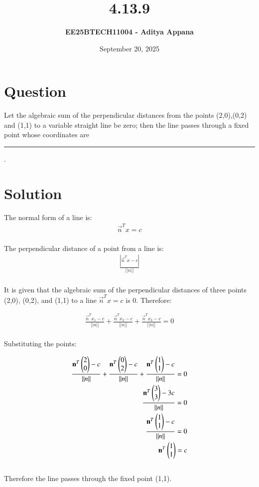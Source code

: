 \documentclass[12pt]{article}
\title{\textbf{4.13.9}}
\author{\textbf{EE25BTECH11004 - Aditya Appana}}
\date{September 20, 2025}
\begin{document}
\maketitle

\section*{Question}
Let the algebraic sum of the perpendicular distances from the points (2,0),(0,2) and
(1,1) to a variable straight line be zero; then the line passes through a fixed point
whose coordinates are \rule{1.5cm}{0.15mm}.

\section*{Solution}

The normal form of a line is:
\begin{align}
\vec{n}^Tx = c
\end{align}\\
The perpendicular distance of a point from a line is:
\begin{align}
\frac{|\vec{n}^Tx - c|}{||n||}
\end{align}\\
It is given that the algebraic sum of the perpendicular distances of three points (2,0), (0,2), and (1,1) to a line $\vec{n}^Tx = c$ is 0. Therefore:

\begin{align}
\frac{\vec{n}^Tx_1 - c}{||n||} + \frac{\vec{n}^Tx_2 - c}{||n||} + \frac{\vec{n}^Tx_3 - c}{||n||} = 0
\end{align}\\
Substituting the points:

\begin{align}
\frac{\mathbf{n}^T\begin{pmatrix}2\\0\end{pmatrix} - c}{||n||} + \frac{\mathbf{n}^T\begin{pmatrix}0\\2\end{pmatrix} - c}{||n||} + \frac{\mathbf{n}^T\begin{pmatrix}1\\1\end{pmatrix} - c}{||n||} = 0 \\
\frac{\mathbf{n}^T\begin{pmatrix}3\\3\end{pmatrix} - 3c}{||n||} = 0 \\
\frac{\mathbf{n}^T\begin{pmatrix}1\\1\end{pmatrix} - c}{||n||} = 0 \\
\mathbf{n}^T\begin{pmatrix}1\\1\end{pmatrix} = c
\end{align}\\
Therefore the line passes through the fixed point (1,1).
\end{document}
